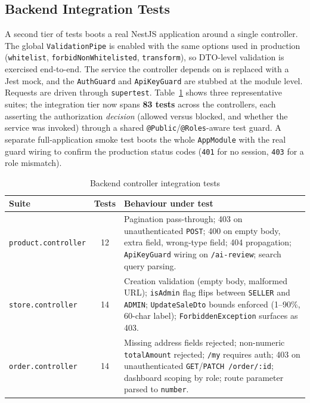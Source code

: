 \documentclass[12pt, a4paper, oneside]{report}
\begin{document}
\subsection{Backend Integration Tests}

A second tier of tests boots a real NestJS application around a
single controller. The global \texttt{ValidationPipe} is enabled with
the same options used in production (\texttt{whitelist},
\texttt{forbidNonWhitelisted}, \texttt{transform}), so DTO-level
validation is exercised end-to-end. The service the controller
depends on is replaced with a Jest mock, and the \texttt{AuthGuard}
and \texttt{ApiKeyGuard} are stubbed at the module level. Requests
are driven through \texttt{supertest}. Table~\ref{tab:backend-integration}
shows three representative suites; the integration tier now spans
\textbf{83 tests} across the controllers, each asserting the
authorization \emph{decision} (allowed versus blocked, and whether the
service was invoked) through a shared \texttt{@Public}/\texttt{@Roles}-aware
test guard. A separate full-application smoke test boots the whole
\texttt{AppModule} with the real guard wiring to confirm the
production status codes (\texttt{401} for no session, \texttt{403} for
a role mismatch).

\begin{table}[H]
\centering
\small
\setlength{\tabcolsep}{8pt}
\setlength{\extrarowheight}{3pt}
\renewcommand{\arraystretch}{1.4}
\begin{tabular}{|>{\raggedright\arraybackslash}p{3.8cm}|c|>{\raggedright\arraybackslash}p{6.8cm}|}
\hline
\rowcolor{cheebolightgray}
\textbf{Suite} & \textbf{Tests} & \textbf{Behaviour under test} \\
\hline
\texttt{product.controller} & 12 & Pagination pass-through; 403 on unauthenticated \texttt{POST}; 400 on empty body, extra field, wrong-type field; 404 propagation; \texttt{ApiKeyGuard} wiring on \texttt{/ai-review}; search query parsing. \\
\hline
\texttt{store.controller} & 14 & Creation validation (empty body, malformed URL); \texttt{isAdmin} flag flips between \texttt{SELLER} and \texttt{ADMIN}; \texttt{UpdateSaleDto} bounds enforced (1--90\%, 60-char label); \texttt{ForbiddenException} surfaces as 403. \\
\hline
\texttt{order.controller} & 14 & Missing address fields rejected; non-numeric \texttt{totalAmount} rejected; \texttt{/my} requires auth; 403 on unauthenticated \texttt{GET}/\texttt{PATCH /order/:id}; dashboard scoping by role; route parameter parsed to \texttt{number}. \\
\hline
\end{tabular}
\caption{Backend controller integration tests}
\label{tab:backend-integration}
\end{table}
\end{document}
